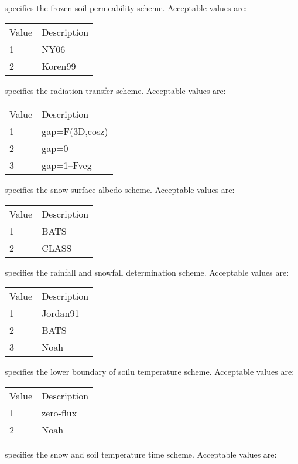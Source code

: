   specifies the frozen soil permeability scheme.
 Acceptable values are:

 \begin{tabular}{ll}
 Value & Description \\
  1    & NY06        \\
  2    & Koren99     \\
 \end{tabular}

  specifies the radiation transfer scheme.
 Acceptable values are:

 \begin{tabular} {ll}
 Value & Description    \\
  1    & gap=F(3D,cosz) \\
  2    & gap=0          \\
  3    & gap=1--Fveg    \\
 \end{tabular}

  specifies the snow surface albedo scheme.
 Acceptable values are:

 \begin{tabular}{ll}
 Value & Description \\
  1    & BATS        \\
  2    & CLASS       \\
 \end{tabular}

  specifies the rainfall and snowfall
 determination scheme.  Acceptable values are:

 \begin{tabular} {ll}
 Value & Description \\
  1    & Jordan91    \\
  2    & BATS        \\
  3    & Noah        \\
 \end{tabular}

  specifies the lower boundary of soilu
 temperature scheme.  Acceptable values are:

 \begin{tabular} {ll}
 Value & Description \\
  1    & zero-flux   \\
  2    & Noah        \\
 \end{tabular}

  specifies the snow and soil temperature
 time scheme.  Acceptable values are:

